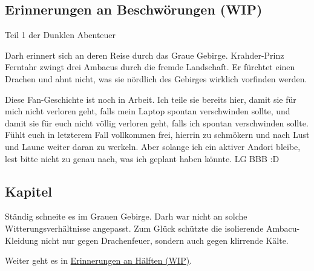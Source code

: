 \begin{chapterbox}
    \chapter{Erinnerungen an Beschwörungen (WIP)}
    \label{wip-erinnerungen-an-beschwoerungen}
    
    \begin{center}
        Teil 1 der Dunklen Abenteuer

    \end{center}

    Darh erinnert sich an deren Reise durch das Graue Gebirge. Krahder-Prinz Ferntahr zwingt drei Ambacus durch die fremde Landschaft. Er fürchtet einen Drachen und ahnt nicht, was sie nördlich des Gebirges wirklich vorfinden werden.
\end{chapterbox}



Diese Fan-Geschichte ist noch in Arbeit. Ich teile sie bereits hier, damit sie für mich nicht verloren geht, falls mein Laptop spontan verschwinden sollte, und damit sie für euch nicht völlig verloren geht, falls ich spontan verschwinden sollte. Fühlt euch in letzterem Fall vollkommen frei, hierrin zu schmökern und nach Lust und Laune weiter daran zu werkeln. Aber solange ich ein aktiver Andori bleibe, lest bitte nicht zu genau nach, was ich geplant haben könnte. LG BBB :D



\newpage
\section{Kapitel}


Ständig schneite es im Grauen Gebirge. Darh war nicht an solche Witterungsverhältnisse angepasst. Zum Glück schützte die isolierende Ambacu-Kleidung nicht nur gegen Drachenfeuer, sondern auch gegen klirrende Kälte.



\begin{commentbox}
    Weiter geht es in \hyperref[wip-erinnerungen-an-haelften]{Erinnerungen an Hälften (WIP)}.
\end{commentbox}
